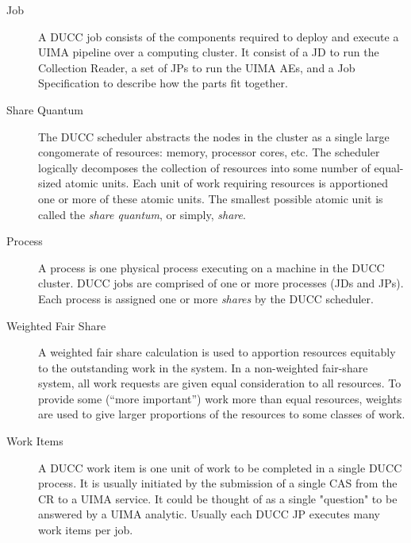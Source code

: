 \begin{description}
\item[Job] A DUCC job consists of the components required to deploy and execute a UIMA pipeline over
  a computing cluster. It consist of a JD to run the Collection Reader, a set of JPs to run the UIMA
  AEs, and a Job Specification to describe how the parts fit together.

\item[Share Quantum] The DUCC scheduler abstracts the nodes in the cluster as a single large
  congomerate of resources: memory, processor cores, etc.  The scheduler logically decomposes 
  the collection of resources into some number of equal-sized atomic units.  Each unit of work requiring
  resources is apportioned one or more of these atomic units.  The smallest possible atomic 
  unit is called the {\em share quantum}, or simply, {\em share}.

\item[Process]A process is one physical process executing on a machine in the DUCC cluster. DUCC
  jobs are comprised of one or more processes (JDs and JPs).  Each process is assigned one or
  more {\em shares} by the DUCC scheduler.

\item[Weighted Fair Share] A weighted fair share calculation is used to apportion resources
  equitably to the outstanding work in the system.  In a non-weighted fair-share system, all
  work requests are given equal consideration to all resources.  To provide some (``more important'')
  work more than equal resources, weights are used to give larger proportions of the resources to
  some classes of work.

\item[Work Items] A DUCC work item is one unit of work to be completed in a single DUCC process. It is
  usually initiated by the submission of a single CAS from the CR to a UIMA service. It could be
  thought of as a single "question" to be answered by a UIMA analytic. Usually each DUCC JP executes
  many work items per job.
\end{description}


